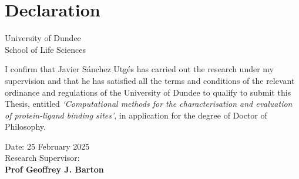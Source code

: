 \chapter*{Declaration} %

\begin{center}
    \LARGE University of Dundee\\[1cm]
    \LARGE School of Life Sciences\\[2cm]
\end{center}

I confirm that Javier Sánchez Utgés has carried out the research under my supervision and that he has satisfied all the terms and conditions of the relevant ordinance and regulations of the University of Dundee to qualify to submit this Thesis, entitled \textit{`Computational methods for the characterisation and evaluation of protein-ligand binding sites'}, in application for the degree of Doctor of Philosophy.

\vfill

\begin{flushright}
    Date: 25 February 2025\\[1.5cm]
    Research Supervisor: \underline{\hspace{6cm}}\\[1cm]
    \textbf{Prof Geoffrey J. Barton}
\end{flushright}